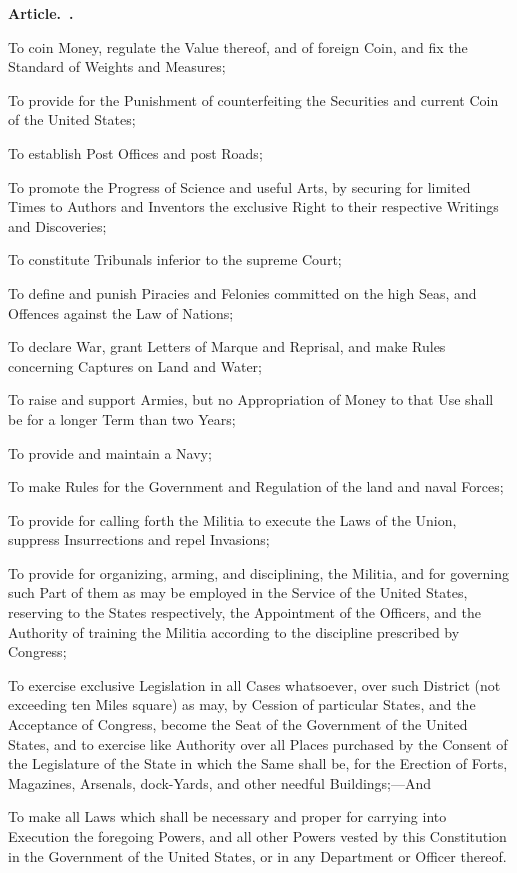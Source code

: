 \documentclass[12pt]{article}
\newcounter{article}
\newenvironment{article}
{\stepcounter{article}\setcounter{sect}{0}\begin{center}
{\bf Article.~\Roman{article}.}
\end{center}}
{}
\newcounter{sect}[article]
\newenvironment{sect}
{\stepcounter{sect}{\bf Section.~\arabic{sect}.}}
{}
\begin{document}
\begin{article}
\begin{sect}
To coin Money, regulate the Value thereof, and of foreign Coin, and fix the Standard of Weights and Measures;

To provide for the Punishment of counterfeiting the Securities and current Coin of the United States;

To establish Post Offices and post Roads;

To promote the Progress of Science and useful Arts, by securing for limited Times to Authors and Inventors the exclusive Right to their respective Writings and Discoveries;

To constitute Tribunals inferior to the supreme Court;

To define and punish Piracies and Felonies committed on the high Seas, and Offences against the Law of Nations;

To declare War, grant Letters of Marque and Reprisal, and make Rules concerning Captures on Land and Water;

To raise and support Armies, but no Appropriation of Money to that Use shall be for a longer Term than two Years;

To provide and maintain a Navy;

To make Rules for the Government and Regulation of the land and naval Forces;

To provide for calling forth the Militia to execute the Laws of the Union, suppress Insurrections and repel Invasions;

To provide for organizing, arming, and disciplining, the Militia, and for governing such Part of them as may be employed in the Service of the United States, reserving to the States respectively, the Appointment of the Officers, and the Authority of training the Militia according to the discipline prescribed by Congress;

To exercise exclusive Legislation in all Cases whatsoever, over such District (not exceeding ten Miles square) as may, by Cession of particular States, and the Acceptance of Congress, become the Seat of the Government of the United States, and to exercise like Authority over all Places purchased by the Consent of the Legislature of the State in which the Same shall be, for the Erection of Forts, Magazines, Arsenals, dock-Yards, and other needful Buildings;---And

To make all Laws which shall be necessary and proper for carrying into Execution the foregoing Powers, and all other Powers vested by this Constitution in the Government of the United States, or in any Department or Officer thereof.
\end{sect}


\end{article}
\end{document}
